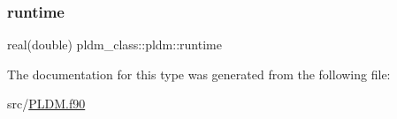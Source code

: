 \subsubsection{\texorpdfstring{runtime}{runtime}}
{\footnotesize\ttfamily real(double) pldm\+\_\+class\+::pldm\+::runtime\hspace{0.3cm}{\ttfamily [private]}}



The documentation for this type was generated from the following file\+:\begin{DoxyCompactItemize}
\item 
src/\hyperlink{_p_l_d_m_8f90}{P\+L\+D\+M.\+f90}\end{DoxyCompactItemize}
